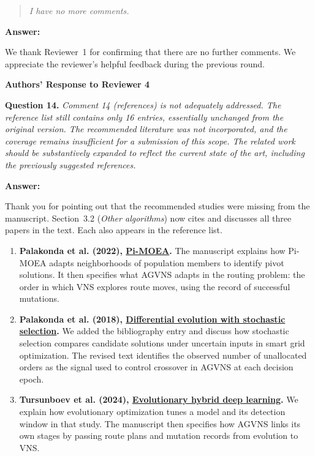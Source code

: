 \documentclass[11pt]{article}
\newcommand{\question}[2]{\vspace{0.5em}\noindent\textbf{Question #1.} \emph{#2}\par}
\newcommand{\answer}{\noindent\textbf{Answer:}\par}
\begin{document}
\begin{quote}\emph{I have no more comments.}\end{quote}

\answer
We thank Reviewer~1 for confirming that there are no further comments. We appreciate the reviewer's helpful feedback during the previous round.

\clearpage
\begin{center}
\textbf{\Large Authors' Response to Reviewer 4}
\end{center}

\question{14}{Comment 14 (references) is not adequately addressed. The reference list still contains only 16 entries, essentially unchanged from the original version. The recommended literature was not incorporated, and the coverage remains insufficient for a submission of this scope. The related work should be substantively expanded to reflect the current state of the art, including the previously suggested references.}

\answer
Thank you for pointing out that the recommended studies were missing from the manuscript. Section~3.2 (\emph{Other algorithms}) now cites and discusses all three papers in the text. Each also appears in the reference list.

\begin{enumerate}[leftmargin=2em]
    \item \textbf{Palakonda et al. (2022), \href{https://doi.org/10.1016/j.ins.2022.05.119}{Pi-MOEA}.} The manuscript explains how Pi-MOEA adapts neighborhoods of population members to identify pivot solutions. It then specifies what AGVNS adapts in the routing problem: the order in which VNS explores route moves, using the record of successful mutations.
    \item \textbf{Palakonda et al. (2018), \href{https://doi.org/10.1109/CEC.2018.8477809}{Differential evolution with stochastic selection}.} We added the bibliography entry and discuss how stochastic selection compares candidate solutions under uncertain inputs in smart grid optimization. The revised text identifies the observed number of unallocated orders as the signal used to control crossover in AGVNS at each decision epoch.
    \item \textbf{Tursunboev et al. (2024), \href{https://doi.org/10.1016/j.apenergy.2024.122847}{Evolutionary hybrid deep learning}.} We explain how evolutionary optimization tunes a model and its detection window in that study. The manuscript then specifies how AGVNS links its own stages by passing route plans and mutation records from evolution to VNS.
\end{enumerate}
\end{document}
